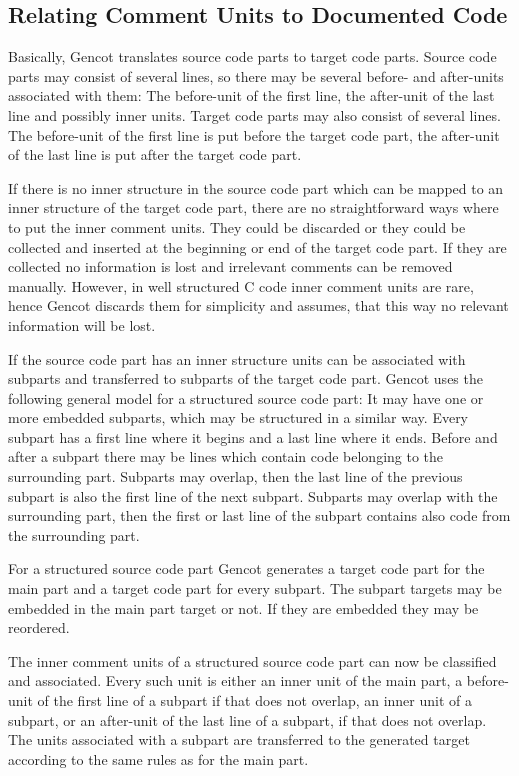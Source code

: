 \documentclass[a4paper]{report}
\begin{document}
\subsection{Relating Comment Units to Documented Code}

Basically, Gencot translates source code parts to target code parts. Source code parts may consist of several lines,
so there may be several before- and after-units associated with them: The before-unit of the first line, the after-unit
of the last line and possibly inner units. Target code parts may also consist of several lines. The before-unit of
the first line is put before the target code part, the after-unit of the last line is put after the target code part.

If there is no inner structure in the source code part which can be mapped to an inner structure of the target code
part, there are no straightforward ways where to put the inner comment units. They could be discarded or they could be
collected and inserted at the beginning or end of the target code part. If they are collected no information is lost 
and irrelevant comments can be removed manually. However, in well structured C code inner comment units are rare,
hence Gencot discards them for simplicity and assumes, that this way no relevant information will be lost.

If the source code part has an inner structure units can be associated with subparts and transferred to subparts of the
target code part. Gencot uses the following general model for a structured source code part: It may have one or more
embedded subparts, which may be structured in a similar way. Every subpart has a first line where it begins and a last 
line where it ends. Before and after a subpart
there may be lines which contain code belonging to the surrounding part. Subparts may overlap, then the last line of 
the previous subpart is also the first line of the next subpart. Subparts may overlap with the surrounding part, then 
the first or last line of the subpart contains also code from the surrounding part.

For a structured source code part Gencot generates a target code part for the main part and a target code part for every 
subpart. The subpart targets may be embedded in the main part target or not. If they are embedded they may be reordered.

The inner comment units of a structured source code part can now be classified and associated. Every such unit is either
an inner unit of the main part, a before-unit of the first line of a subpart if that does not overlap, an inner 
unit of a subpart, or an after-unit of the last line of a subpart, if that does not overlap. The units associated with a subpart
are transferred to the generated target according to the same rules as for the main part. 
\end{document}
